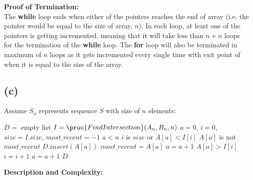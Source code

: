     \textbf{Proof of Termination:} \\
    The \textbf{while} loop ends when either of the pointers reaches the end of array (i.e. the pointer would be equal to the size of array, $n$). In each loop, at least one of the pointers is
    getting incremented, meaning that it will take less than $n+n$ loops for the termination of the \textbf{while} loop. The \textbf{for} loop will also be terminated in maximum of $n$ loops as it gets
    incremented every single time with exit point of when it is equal to the size of the array.

    \subsection{(c)}
    \begin{spacing}{1.2}
        Assume $S_n$ represents sequence $S$ with size of $n$ elements:
        \begin{codebox}
            \li $D =$ empty list
            \li $I = \proc{FindIntersection}(A_n, B_n, n)$
            \li $a = 0$, $i = 0$, $size=I.size$, $most\_recent = -1$
            \li \While $a < n$
                \Do
                    \li \If $i$ is $size$ or $A[a]<I[i]$
                    \Then
                        \li \If $A[a]$ is not $most\_recent$
                        \Then
                            \li $D.insert(A[a])$
                            \li $most\_recent = A[a]$
                        \End
                        \li $a = a + 1$
                    \li \ElseIf $A[a]>I[i]$
                    \Then
                        \li $i = i + 1$
                    \li \ElseNoIf
                        \li $a = a + 1$
                    \End 
                \End
            \li \Return $D$
        \end{codebox}
    \end{spacing}
    \vspace{5mm}
    \textbf{Description and Complexity:}
    
